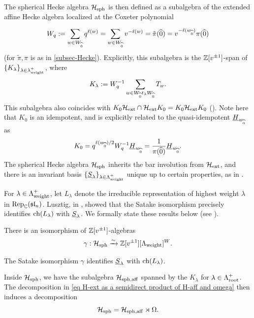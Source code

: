 The spherical Hecke algebra $\mathcal{H}_{\operatorname{sph}}$ is then defined as a subalgebra of the extended affine Hecke algebra localized at the Coxeter polynomial 

\begin{equation}\label{eq coxeter polynomial achar to williamson}
W_q:=\sum_{w \in W_{\widehat{0}}}q^{\ell(w)}=\sum_{w \in W_{\widehat{0}}}v^{-\ell(w)}=\tilde{\pi}(\widehat{0})=v^{-\ell(w_{\widehat{0}})}\pi(\widehat{0})
\end{equation}
(for $\tilde{\pi}, \pi$ is as in \cref{subsec-Hecke}).
Explicitly, this subalgebra is the $\mathbb{Z}[v^{\pm 1}]$-span of $\{K_\lambda\}_{\lambda \in \lambda_{\operatorname{weight}}^+}$, where
\begin{equation}\label{eq standard basis spherical Hecke}
    K_\lambda:=W_q^{-1} \sum_{w\in W_{\widehat{0}}t_\lambda W_{\widehat{0}}}T_w.
\end{equation}
This subalgebra also coincides with $K_0\mathcal{H}_{\operatorname{ext}}\cap \mathcal{H}_{\operatorname{ext}}K_0=K_0\mathcal{H}_{\operatorname{ext}}K_0$ (\cite[Lemma 9.3.6]{Ach}).
Note here that $K_0$ is an idempotent, and is explicitly related to the quasi-idempotent $\underline{H}_{w_{\widehat{0}}}$ as
\begin{equation}
    K_0=q^{\ell(w_{\widehat{0}})/2}W_{q}^{-1}\underline{H}_{w_{\widehat{0}}}=\frac{1}{\pi(\widehat{0})}\underline{H}_{w_{\widehat{0}}}.
\end{equation}
The spherical Hecke algebra $\mathcal{H}_{\operatorname{sph}}$ inherits the bar involution from $\mathcal{H}_{\operatorname{ext}}$, and there is an invariant basis $\{\underline{S}_{\lambda}\}_{\lambda \in \Lambda^+_{\operatorname{weight}}}$ unique up to certain properties, as in \cite[Theorem 9.3.7]{Ach}.


For $\lambda \in \Lambda_{\operatorname{weight}}^+$, let $L_{\lambda}$ denote the irreducible representation of highest weight $\lambda$ in $\operatorname{Rep}_{\mathbb{C}}(\mathfrak{sl}_n)$.
Lusztig, in \cite{LusztigGS}, showed that the Satake isomorphism precisely identifies $\operatorname{ch}(L_\lambda)$ with $\underline{S}_\lambda$. We formally state these results below (see \cite[Theorem 9.4.1, 9.4.2]{Ach}).

\begin{theorem}[Satake]\label{thm Satake original}
    There is an isomorphism of $\mathbb{Z}[v^{\pm 1}]$-algebras 
    $$\gamma: \mathcal{H}_{\operatorname{sph}} \xrightarrow{\sim} \mathbb{Z}[v^{\pm 1}][\Lambda_{\operatorname{weight}}]^W.$$
\end{theorem}

\begin{theorem}[Lusztig]\label{thm Lusztig Satake}
    The Satake isomorphism $\gamma$ identifies $\underline{S}_\lambda$ with $\operatorname{ch}(L_\lambda)$.
\end{theorem}


Inside $\mathcal{H}_{\operatorname{sph}}$, we have the subalgebra $\mathcal{H}_{\operatorname{sph}, \operatorname{aff}}$ spanned by the $K_\lambda$ for $\lambda \in \Lambda_{\operatorname{root}}^+$.
The decomposition in \cref{eq H-ext as a semidirect product of H-aff and omega} then induces a decomposition
\begin{equation}
    \mathcal{H}_{\operatorname{sph}}=\mathcal{H}_{\operatorname{sph}, \operatorname{aff}} \rtimes \Omega.
\end{equation}

